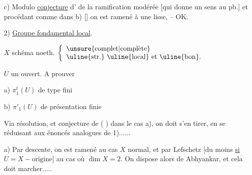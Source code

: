 c)  Modulo \uline{conjecture} d'  de la ramification modérée  [qui donne un sens au pb.] et procédant comme dans b) [] on est ramené à une  lisse, -- OK.


2) \uline{Groupe fondamental local}.

$X$  schéma noeth. $\left\{\begin{array}{l}\text{\unsure{complet|complète}}\\\text{\uline{str.} \uline{local} et \uline{bon}.}\end{array}\right.$

$U$ un ouvert. A prouver

a) $\pi_1^t(U)$ de type fini

b) $\pi'_1(U)$ de présentation finie

Via résolution, et conjecture de  ( ) dans le cas a), on doit s'en tirer, en se réduisant aux énoncés analogues  de 1)......

a) Par descente, on est ramené au cas $X$ normal, et par Lefschetz [du moins \uline{si $U=X-\text{origine}$}] au cas où $\dim X=2$. On dispose alors de Abhyankar, et cela doit marcher.....


